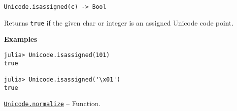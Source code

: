 \begin{adjustwidth}{2em}{0pt}


\begin{verbatim}
Unicode.isassigned(c) -> Bool
\end{verbatim}

Returns \texttt{true} if the given char or integer is an assigned Unicode code point.

\textbf{Examples}


\begin{verbatim}
julia> Unicode.isassigned(101)
true

julia> Unicode.isassigned('\x01')
true
\end{verbatim}



\end{adjustwidth}
\hypertarget{6168731775693095830}{} 
\hyperlink{6168731775693095830}{\texttt{Unicode.normalize}}  -- {Function.}

